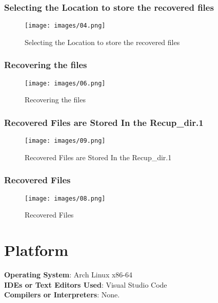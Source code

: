\documentclass[11pt]{article}
\begin{document}
\subsubsection*{Selecting the Location to store the recovered files}
\begin{figure}[H]
    \centering
    \texttt{[image: images/04.png]}
    \caption{Selecting the Location to store the recovered files}
\end{figure}

\subsubsection*{Recovering the files}
\begin{figure}[H]
    \centering
    \texttt{[image: images/06.png]}
    \caption{Recovering the files}
\end{figure}

\subsubsection*{Recovered Files are Stored In the Recup\_dir.1}
\begin{figure}[H]
    \centering
    \texttt{[image: images/09.png]}
    \caption{Recovered Files are Stored In the Recup\_dir.1}
\end{figure}

\subsubsection*{Recovered Files}
\begin{figure}[H]
    \centering
    \texttt{[image: images/08.png]}
    \caption{Recovered Files}
\end{figure}


\section{Platform}
\textbf{Operating System}: Arch Linux x86-64 \\
\textbf{IDEs or Text Editors Used}: Visual Studio Code\\
\textbf{Compilers or Interpreters}: None.\\

% 
\end{document}
